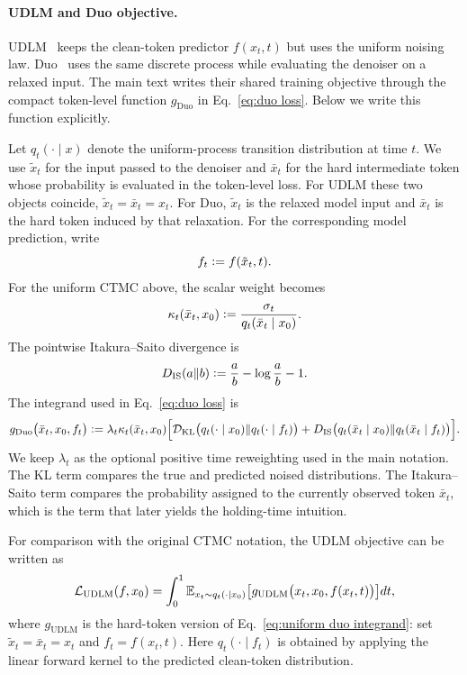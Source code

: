 \begin{reviewblock}
\paragraph{UDLM and Duo objective.}
UDLM~\citep{schiff2024discreteguidance} keeps the clean-token predictor $f(x_t,t)$ but uses the uniform noising law. Duo~\citep{sahoo2025the} uses the same discrete process while evaluating the denoiser on a relaxed input. The main text writes their shared training objective through the compact token-level function $g_{\mathrm{Duo}}$ in Eq.~\eqref{eq:duo loss}. Below we write this function explicitly.

Let $q_t(\cdot\mid x)$ denote the uniform-process transition distribution at time $t$. We use $\tilde{x}_t$ for the input passed to the denoiser and $\bar{x}_t$ for the hard intermediate token whose probability is evaluated in the token-level loss. For UDLM these two objects coincide, $\tilde{x}_t=\bar{x}_t=x_t$. For Duo, $\tilde{x}_t$ is the relaxed model input and $\bar{x}_t$ is the hard token induced by that relaxation. For the corresponding model prediction, write
\[
    f_t\vcentcolon=f(\tilde{x}_t,t).
\]
For the uniform CTMC above, the scalar weight becomes \citep{rutte2025generalized}
\[
    \kappa_t(\bar{x}_t,x_0)
    \vcentcolon=
    \frac{\sigma_t}{q_t(\bar{x}_t\mid x_0)}.
\]
The pointwise Itakura--Saito divergence is
\[
    D_{\mathrm{IS}}(a\|b) \vcentcolon= \frac{a}{b} - \log \frac{a}{b} - 1.
\]
The integrand used in Eq.~\eqref{eq:duo loss} is
\begin{equation}
\label{eq:uniform duo integrand}
g_{\mathrm{Duo}}\bigl(\bar{x}_t,x_0,f_t\bigr)
\vcentcolon=
\lambda_t\kappa_t(\bar{x}_t,x_0)\Bigl[\mathcal{D}_{\mathrm{KL}}\bigl(q_t(\cdot\mid x_0)\|q_t(\cdot\mid f_t)\bigr) + D_{\mathrm{IS}}\bigl(q_t(\bar{x}_t\mid x_0)\|q_t(\bar{x}_t\mid f_t)\bigr)\Bigr].
\end{equation}
We keep $\lambda_t$ as the optional positive time reweighting used in the main notation. The KL term compares the true and predicted noised distributions. The Itakura--Saito term compares the probability assigned to the currently observed token $\bar{x}_t$, which is the term that later yields the holding-time intuition.

For comparison with the original CTMC notation, the UDLM objective can be written as
\begin{equation}
\label{eq:udlm loss}
\mathcal{L}_{\mathrm{UDLM}}(f,x_0) = \int_0^1 \mathbb{E}_{x_t\sim q_t(\cdot\mid x_0)}\bigl[g_{\mathrm{UDLM}}\bigl(x_t,x_0,f(x_t,t)\bigr)\bigr]dt,
\end{equation}
where $g_{\mathrm{UDLM}}$ is the hard-token version of Eq.~\eqref{eq:uniform duo integrand}: set $\tilde{x}_t=\bar{x}_t=x_t$ and $f_t=f(x_t,t)$. Here $q_t(\cdot\mid f_t)$ is obtained by applying the linear forward kernel to the predicted clean-token distribution.


\end{reviewblock}

